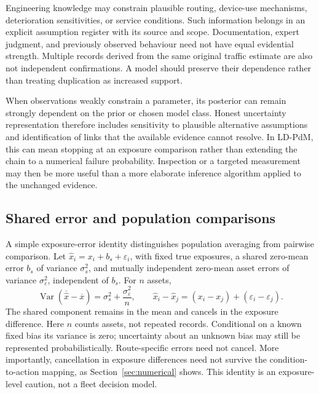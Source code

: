 \documentclass[symmetry,article,submit,pdftex,oneauthor]{Definitions/mdpi}
\begin{document}
Engineering knowledge may constrain plausible routing, device-use mechanisms, deterioration sensitivities, or service conditions. Such information belongs in an explicit assumption register with its source and scope. Documentation, expert judgment, and previously observed behaviour need not have equal evidential strength. Multiple records derived from the same original traffic estimate are also not independent confirmations. A model should preserve their dependence rather than treating duplication as increased support.

When observations weakly constrain a parameter, its posterior can remain strongly dependent on the prior or chosen model class. Honest uncertainty representation therefore includes sensitivity to plausible alternative assumptions and identification of links that the available evidence cannot resolve. In LD-PdM, this can mean stopping at an exposure comparison rather than extending the chain to a numerical failure probability. Inspection or a targeted measurement may then be more useful than a more elaborate inference algorithm applied to the unchanged evidence.

\subsection{Shared error and population comparisons}

A simple exposure-error identity distinguishes population averaging from pairwise comparison. Let $\widehat{x}_i=x_i+b_s+\varepsilon_i$, with fixed true exposures, a shared zero-mean error $b_s$ of variance $\sigma_s^2$, and mutually independent zero-mean asset errors of variance $\sigma_\varepsilon^2$, independent of $b_s$. For $n$ assets,
\begin{equation}
\operatorname{Var}(\overline{\widehat{x}}-\overline{x})
=\sigma_s^2+\frac{\sigma_\varepsilon^2}{n},
\qquad
\widehat{x}_i-\widehat{x}_j=(x_i-x_j)+(\varepsilon_i-\varepsilon_j).
\label{eq:shared-error}
\end{equation}
The shared component remains in the mean and cancels in the exposure difference. Here $n$ counts assets, not repeated records. Conditional on a known fixed bias its variance is zero; uncertainty about an unknown bias may still be represented probabilistically. Route-specific errors need not cancel. More importantly, cancellation in exposure differences need not survive the condition-to-action mapping, as Section~\ref{sec:numerical} shows. This identity is an exposure-level caution, not a fleet decision model.
\end{document}
